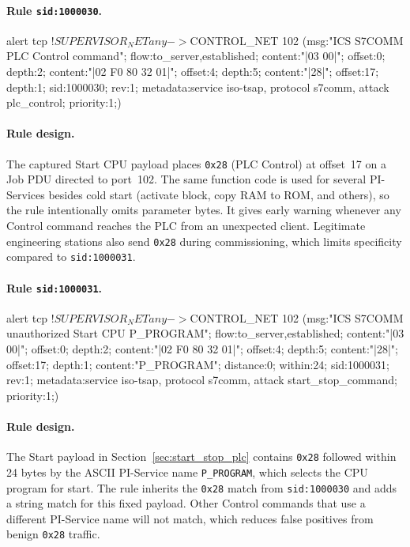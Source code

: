 \documentclass[../main.tex]{subfiles}
\begin{document}
\paragraph{Rule \texttt{sid:1000030}.}
\begin{packetdump}
alert tcp !$SUPERVISOR_NET any -> $CONTROL_NET 102 (msg:"ICS S7COMM PLC Control command";
  flow:to_server,established; content:"|03 00|"; offset:0; depth:2;
  content:"|02 F0 80 32 01|"; offset:4; depth:5; content:"|28|";
  offset:17; depth:1; sid:1000030; rev:1;
  metadata:service iso-tsap, protocol s7comm, attack plc_control; priority:1;)
\end{packetdump}

\paragraph{Rule design.}
The captured Start CPU payload places \texttt{0x28} (PLC Control) at offset~17 on a Job PDU directed to port~102. The same function code is used for several PI-Services besides cold start (activate block, copy RAM to ROM, and others), so the rule intentionally omits parameter bytes. It gives early warning whenever any Control command reaches the PLC from an unexpected client. Legitimate engineering stations also send \texttt{0x28} during commissioning, which limits specificity compared to \texttt{sid:1000031}.

\paragraph{Rule \texttt{sid:1000031}.}
\begin{packetdump}
alert tcp !$SUPERVISOR_NET any -> $CONTROL_NET 102 (msg:"ICS S7COMM unauthorized Start CPU P_PROGRAM";
  flow:to_server,established; content:"|03 00|"; offset:0; depth:2;
  content:"|02 F0 80 32 01|"; offset:4; depth:5; content:"|28|";
  offset:17; depth:1; content:"P_PROGRAM"; distance:0; within:24;
  sid:1000031; rev:1;
  metadata:service iso-tsap, protocol s7comm, attack start_stop_command; priority:1;)
\end{packetdump}

\paragraph{Rule design.}
The Start payload in Section~\ref{sec:start_stop_plc} contains \texttt{0x28} followed within 24 bytes by the ASCII PI-Service name \texttt{P\_PROGRAM}, which selects the CPU program for start. The rule inherits the \texttt{0x28} match from \texttt{sid:1000030} and adds a string match for this fixed payload. Other Control commands that use a different PI-Service name will not match, which reduces false positives from benign \texttt{0x28} traffic.
\end{document}

